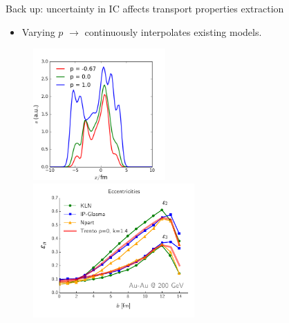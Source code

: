 \documentclass[11pt]{beamer}
\begin{document}
\begin{frame}[noframenumbering]{Back up: uncertainty in IC affects transport properties extraction}
\begin{itemize}
\item Varying $p$ $\rightarrow$ continuously interpolates existing models.
\end{itemize}
\begin{center}
\begin{figure}
\includegraphics[width = 0.45\textwidth]{./pics/interp.png}
\includegraphics[width = 0.55\textwidth]{./pics/trento-vs-glasma.pdf}
\end{figure}
\end{center}
\end{frame}
\end{document}
